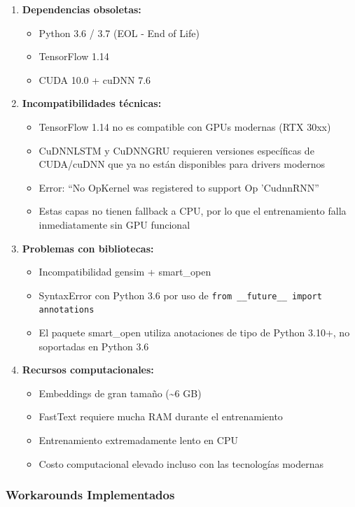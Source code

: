 \documentclass[11pt,a4paper]{article}
\begin{document}
\begin{enumerate}
    \item \textbf{Dependencias obsoletas:}
    \begin{itemize}
        \item Python 3.6 / 3.7 (EOL - End of Life)
        \item TensorFlow 1.14
        \item CUDA 10.0 + cuDNN 7.6
    \end{itemize}
    \item \textbf{Incompatibilidades técnicas:}
    \begin{itemize}
        \item TensorFlow 1.14 no es compatible con GPUs modernas (RTX 30xx)
        \item CuDNNLSTM y CuDNNGRU requieren versiones específicas de CUDA/cuDNN que ya no están disponibles para drivers modernos
        \item Error: ``No OpKernel was registered to support Op 'CudnnRNN''
        \item Estas capas no tienen fallback a CPU, por lo que el entrenamiento falla inmediatamente sin GPU funcional
    \end{itemize}
    \item \textbf{Problemas con bibliotecas:}
    \begin{itemize}
        \item Incompatibilidad gensim + smart\_open
        \item SyntaxError con Python 3.6 por uso de \texttt{from \_\_future\_\_ import annotations}
        \item El paquete smart\_open utiliza anotaciones de tipo de Python 3.10+, no soportadas en Python 3.6
    \end{itemize}
    \item \textbf{Recursos computacionales:}
    \begin{itemize}
        \item Embeddings de gran tamaño (\textasciitilde6 GB)
        \item FastText requiere mucha RAM durante el entrenamiento
        \item Entrenamiento extremadamente lento en CPU
        \item Costo computacional elevado incluso con las tecnologías modernas
    \end{itemize}
\end{enumerate}

\subsubsection{Workarounds Implementados}
\end{document}
